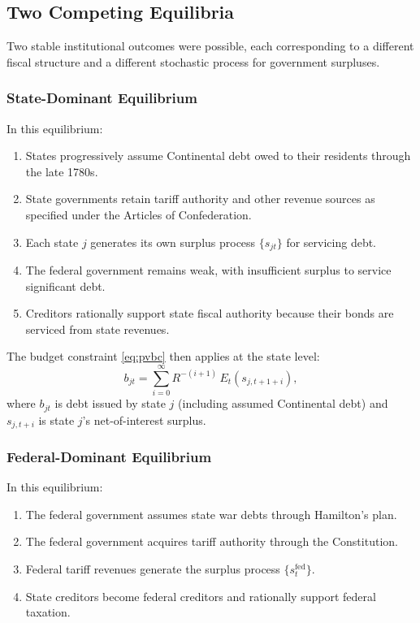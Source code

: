 \documentclass[12pt]{article}
\begin{document}
\subsection{Two Competing Equilibria}

Two stable institutional outcomes were possible, each corresponding to a
different fiscal structure and a different stochastic process for
government surpluses.

\subsubsection{State-Dominant Equilibrium}

In this equilibrium:
\begin{enumerate}
\item States progressively assume Continental debt owed to their
  residents through the late 1780s.
\item State governments retain tariff authority and other revenue sources
  as specified under the Articles of Confederation.
\item Each state $j$ generates its own surplus process $\{s_{jt}\}$ for
  servicing debt.
\item The federal government remains weak, with insufficient surplus to
  service significant debt.
\item Creditors rationally support state fiscal authority because their
  bonds are serviced from state revenues.
\end{enumerate}

The budget constraint \eqref{eq:pvbc} then applies at the state level:
\begin{equation}
\label{eq:state}
b_{jt} = \sum_{i=0}^{\infty} R^{-(i+1)}\, E_t(s_{j,t+1+i}),
\end{equation}
where $b_{jt}$ is debt issued by state $j$ (including assumed
Continental debt) and $s_{j,t+i}$ is state $j$'s net-of-interest
surplus.

\subsubsection{Federal-Dominant Equilibrium}

In this equilibrium:
\begin{enumerate}
\item The federal government assumes state war debts through Hamilton's
  plan.
\item The federal government acquires tariff authority through the
  Constitution.
\item Federal tariff revenues generate the surplus process
  $\{s_t^{\text{fed}}\}$.
\item State creditors become federal creditors and rationally support
  federal taxation.
\end{enumerate}
\end{document}
